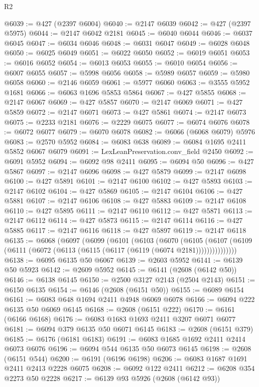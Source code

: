 \begin{lexlean}{R2}
\begin{coremodule}
@6039 := @427 (@2397 @6004)
@6040 := @2147 @6039
@6042 := @427 (@2397 @5975)
@6044 := @2147 @6042 @2181
@6045 := @6040 @6044
@6046 := @6037 @6045
@6047 := @6034 @6046
@6048 := @6031 @6047
@6049 := @6028 @6048
@6050 := @6025 @6049
@6051 := @6022 @6050
@6052 := @6019 @6051
@6053 := @6016 @6052
@6054 := @6013 @6053
@6055 := @6010 @6054
@6056 := @6007 @6055
@6057 := @5998 @6056
@6058 := @5989 @6057
@6059 := @5980 @6058
@6060 := @2146 @6059
@6061 := @5977 @6060
@6063 := @3555 @5952 @1681
@6066 := @6063 @1696 @5853 @5864
@6067 := @427 @5855
@6068 := @2147 @6067
@6069 := @427 @5857
@6070 := @2147 @6069
@6071 := @427 @5859
@6072 := @2147 @6071
@6073 := @427 @5861
@6074 := @2147 @6073
@6075 := @2233 @2181
@6076 := @2229 @6075
@6077 := @6074 @6076
@6078 := @6072 @6077
@6079 := @6070 @6078
@6082 := @6066 (@6068 @6079) @5976
@6083 := @2570 @5952
@6084 := @6083 @638
@6089 := @6084 @1695 @2411 @5852 @6067 @6079
@6091 := LexLeanPreservation.conv_field @2450
@6092 := @6091 @5952
@6094 := @6092 @98 @2411
@6095 := @6094 @50
@6096 := @427 @5867
@6097 := @2147 @6096
@6098 := @427 @5879
@6099 := @2147 @6098
@6100 := @427 @5891
@6101 := @2147 @6100
@6102 := @427 @5893
@6103 := @2147 @6102
@6104 := @427 @5869
@6105 := @2147 @6104
@6106 := @427 @5881
@6107 := @2147 @6106
@6108 := @427 @5883
@6109 := @2147 @6108
@6110 := @427 @5895
@6111 := @2147 @6110
@6112 := @427 @5871
@6113 := @2147 @6112
@6114 := @427 @5873
@6115 := @2147 @6114
@6116 := @427 @5885
@6117 := @2147 @6116
@6118 := @427 @5897
@6119 := @2147 @6118
@6135 := @6068
    (@6097
      (@6099
        (@6101
          (@6103
            (@6070
              (@6105
                (@6107 (@6109 (@6111 (@6072 (@6113 (@6115 (@6117 (@6119 (@6074 @2181)))))))))))))))
@6138 := @6095 @6135 @50 @6067
@6139 := @2603 @5952
@6141 := @6139 @50 @5923
@6142 := @2609 @5952
@6145 := @6141 (@2608 (@6142 @50))
@6146 := @6138 @6145
@6150 := @2500 @3127 @2143 (@2504 @2143)
@6151 := @6150 @6135
@6154 := @6146 (@2608 (@6151 @50))
@6155 := @6089 @6154
@6161 := @6083 @648 @1694 @2411 @4948 @6069 @6078
@6166 := @6094 @222 @6135 @50 @6069 @6145
@6168 := @2608 (@6151 @222)
@6170 := @6161 (@6166 @6168)
@6176 := @6083 @1683 @1693 @2411 @3207 @6071 @6077
@6181 := @6094 @379 @6135 @50 @6071 @6145
@6183 := @2608 (@6151 @379)
@6185 := @6176 (@6181 @6183)
@6191 := @6083 @1685 @1692 @2411 @2414 @6073 @6076
@6196 := @6094 @544 @6135 @50 @6073 @6145
@6198 := @2608 (@6151 @544)
@6200 := @6191 (@6196 @6198)
@6206 := @6083 @1687 @1691 @2411 @2413 @2228 @6075
@6208 := @6092 @122 @2411
@6212 := @6208 @354 @2273 @50 @2228
@6217 := @6139 @93 @5926 (@2608 (@6142 @93))

\end{coremodule}
\end{lexlean}

